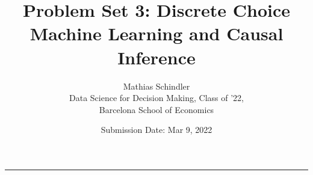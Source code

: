 \documentclass{article}
\title{\Huge Problem Set 3: Discrete Choice \\ \LARGE Machine Learning and Causal Inference}
\author{\Large Mathias Schindler \\ \large Data Science for Decision Making, Class of '22, \\ \large Barcelona School of Economics}
\date{\Large Submission Date: Mar 9, 2022}
\begin{document}
\maketitle
\hrule

\tableofcontents
\listoffigures
\listoftables








\newpage









%
\end{document}
